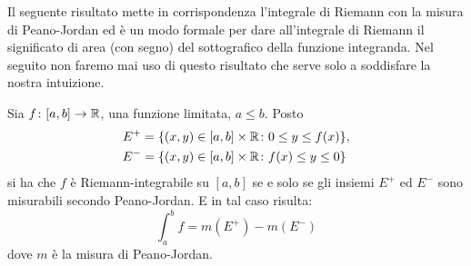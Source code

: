 Il seguente risultato mette in corrispondenza l'integrale di Riemann 
con la misura di Peano-Jordan ed è un modo formale per dare all'integrale 
di Riemann il significato di area (con segno) del sottografico della 
funzione integranda. 
Nel seguito non faremo mai uso di questo risultato che serve solo 
a soddisfare la nostra intuizione.

\begin{theorem}
Sia $f\colon[a,b]\to \mathbb R$, una funzione limitata, $a\leq b$. Posto 
\begin{align*}
  E^+ &= {\left\{ (x,y)\in [a,b]\times\mathbb R\colon 0\le y \le f(x) \right\}}, \\
  E^- &= {\left\{ (x,y)\in [a,b]\times\mathbb R\colon f(x)\le y \le 0 \right\}}   
\end{align*}
si ha che $f$ è Riemann-integrabile su $[a,b]$ se e solo se 
gli insiemi $E^+$ ed $E^-$ sono misurabili secondo Peano-Jordan.
E in tal caso risulta:
\[
   \int_a^b f = m(E^+) - m(E^-)  
\]
dove $m$ è la misura di Peano-Jordan.
\end{theorem}
%
